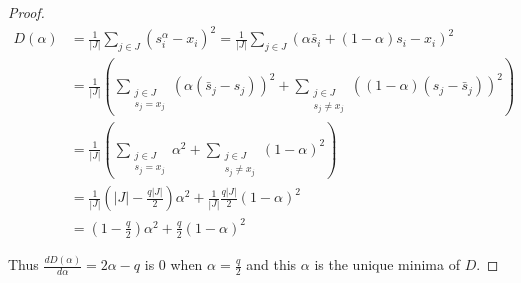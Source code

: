 \documentclass{uibk}
\begin{document}
\begin{proof}
    \begin{align*}
        D(\alpha) &= \frac{1}{|J|} \sum\limits_{j \in J} \left(s_i^\alpha - x_i\right)^2 = \frac{1}{|J|} \sum\limits_{j \in J} \left(\alpha \bar{s}_i + (1-\alpha) s_i - x_i\right)^2\\
                  &= \frac{1}{|J|} \left(\sum\limits_{\substack{j \in J\\ s_j = x_j}} \left(\alpha (\bar{s}_j - s_j)\right)^2 + \sum\limits_{\substack{j \in J\\ s_j \neq x_j}} \left((1 - \alpha) (s_j - \bar{s}_j)\right)^2 \right)\\
                  &= \frac{1}{|J|} \left(\sum\limits_{\substack{j \in J\\ s_j = x_j}} \alpha^2 + \sum\limits_{\substack{j \in J\\ s_j \neq x_j}} (1-\alpha)^2 \right)\\
                  &= \frac{1}{|J|} \left(|J| - \frac{q |J|}{2}\right) \alpha^2 + \frac{1}{|J|} \frac{q |J|}{2} (1 - \alpha)^2\\
                  &= \left(1 - \frac{q}{2}\right) \alpha^2 + \frac{q}{2} (1-\alpha)^2
    \end{align*}

    Thus $\frac{d D(\alpha)}{d\alpha} = 2 \alpha - q $ is $0$ when $\alpha =
    \frac{q}{2}$ and this $\alpha$ is the unique minima of $D$.
\end{proof}
\end{document}
